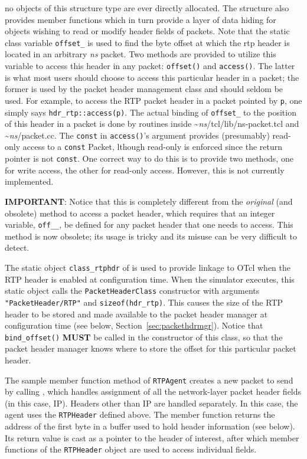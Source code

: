 no objects of this structure type are ever directly allocated.
The structure also provides member functions which in turn
provide a layer of data hiding for objects wishing to read
or modify header fields of packets.
Note that the static class variable {\tt offset\_} is used
to find the byte offset at which the rtp header is located
in an arbitrary \emph{ns} packet.
Two methods are provided to utilize this variable to access this
header in any packet: {\tt offset()} and {\tt access()}.
The latter is what most users should choose to access this particular
header in a packet; the former is used by the packet header management
class and should seldom be used.
For example, to access the RTP packet header in a packet pointed by
{\tt p}, one simply says {\tt hdr\_rtp::access(p)}.
The actual binding of {\tt offset\_} to the position of this header in
a packet is done by routines inside \textasciitilde\emph{ns}/{tcl/lib/ns-packet.tcl} and
\textasciitilde\emph{ns}/{packet.cc}.
The {\tt const} in {\tt access()}'s argument provides (presumably)
read-only access to a {\tt const} Packet, lthough read-only is
enforced since the return pointer is not {\tt const}. 
One correct way to do this is to provide two methods, one for write
access, the other for read-only access.
However, this is not currently implemented.

{\bf IMPORTANT}: Notice that this is completely different from the
{\em original} (and obsolete) method to access a packet header, which
requires that an 
integer variable, {\tt off\_\_}, be defined for any packet
header that one needs to access.
This method is now obsolete; its usage is tricky and its misuse can
be very difficult to detect. 


The static object {\tt class\_rtphdr} of
is used to provide linkage to OTcl when the RTP header is
enabled at configuration time.
When the simulator executes, this static object calls
the {\tt PacketHeaderClass} constructor with arguments
{\tt "PacketHeader/RTP"} and {\tt sizeof(hdr\_rtp)}.
This causes the size of the RTP header to be stored
and made available to the packet header manager
at configuration time (see below, Section~\ref{sec:packethdrmgr}).
Notice that {\tt bind\_offset()} {\bf MUST} be called in the 
constructor of this class, so that the packet
header manager knows where to store the offset for this particular
packet header. 

The sample member function  method
of {\tt RTPAgent} creates a new packet
to send by calling , which handles assignment
of all the network-layer packet header fields (in this case, IP).
Headers other than IP are handled separately.
In this case, the agent uses the {\tt RTPHeader} defined above.
The  member function returns the address
of the first byte in a buffer used to hold header information (see below).
Its return value is cast as a pointer to the header of interest,
after which member functions of the {\tt RTPHeader}
object are used to access individual fields.

